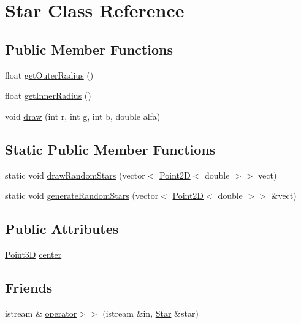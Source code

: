 \hypertarget{classStar}{\section{Star Class Reference}
\label{classStar}
}
\subsection*{Public Member Functions}
\begin{DoxyCompactItemize}
\item 
float \hyperlink{classStar_a3270c6370a58a3cd1b3f208772928fd4}{get\-Outer\-Radius} ()
\item 
float \hyperlink{classStar_a7589c551056483d088f0c8e2ae56f182}{get\-Inner\-Radius} ()
\item 
void \hyperlink{classStar_a5b5a633e1411e3ba772a583d13455a77}{draw} (int r, int g, int b, double alfa)
\end{DoxyCompactItemize}
\subsection*{Static Public Member Functions}
\begin{DoxyCompactItemize}
\item 
static void \hyperlink{classStar_a56336d02d44a5297ad76377b17be334b}{draw\-Random\-Stars} (vector$<$ \hyperlink{classPoint2D}{Point2\-D}$<$ double $>$$>$ vect)
\item 
static void \hyperlink{classStar_a5a45a1a26f35e13f54ca52baf64f6970}{generate\-Random\-Stars} (vector$<$ \hyperlink{classPoint2D}{Point2\-D}$<$ double $>$$>$ \&vect)
\end{DoxyCompactItemize}
\subsection*{Public Attributes}
\begin{DoxyCompactItemize}
\item 
\hyperlink{classPoint3D}{Point3\-D} \hyperlink{classStar_a56595bbf2da9c7b2de04be76f61d2e93}{center}
\end{DoxyCompactItemize}
\subsection*{Friends}
\begin{DoxyCompactItemize}
\item 
istream \& \hyperlink{classStar_ad3471c4d5d15b774543031939eda0f5d}{operator$>$$>$} (istream \&in, \hyperlink{classStar}{Star} \&star)
\end{DoxyCompactItemize}


